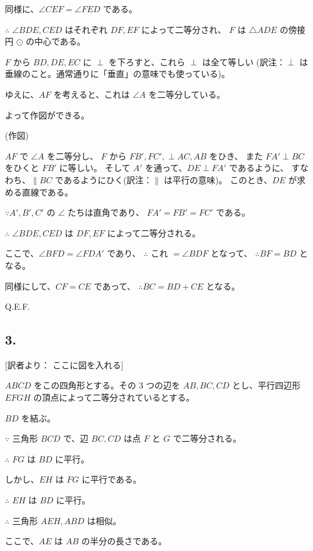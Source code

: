 同様に、$\angle CEF = \angle FED$ である。

$\therefore$ $\angle BDE, CED$ はそれぞれ $DF, EF$ によって二等分され、
$F$ は $\triangle ADE$ の傍接円 $\odot $ の中心である。

$F$ から $BD, DE, EC$ に $\perp$ を下ろすと、これら $\perp$ は全て等しい
(訳注：$\perp$ は垂線のこと。通常通りに「垂直」の意味でも使っている)。

ゆえに、$AF$ を考えると、これは $\angle A$ を二等分している。

よって作図ができる。

\begin{center}(作図)\end{center}

$AF$ で $\angle A$ を二等分し、
$F$ から $FB', FC', \perp AC, AB$ をひき、
また $FA' \perp BC$ をひくと $FB'$ に等しい。
そして $A'$ を通って、$DE \perp FA'$ であるように、
すなわち、$\parallel BC$ であるようにひく(訳注：$\parallel$ は平行の意味)。
このとき、$DE$ が求める直線である。

$\because A', B', C'$ の $\angle$ たちは直角であり、
$FA' = FB' = FC'$ である。

$\therefore$ $\angle BDE, CED$ は $DF, EF$ によって二等分される。

ここで、$\angle BFD = \angle FDA'$ であり、
$\therefore$ これ $= \angle BDF$ となって、
$\therefore BF = BD$ となる。

同様にして、$CF = CE$ であって、
$\therefore BC = BD + CE$ となる。

Q.E.F.

\subsection*{3.}

[訳者より： ここに図を入れる]

$ABCD$ をこの四角形とする。その 3 つの辺を $AB, BC, CD$
とし、平行四辺形 $EFGH$ の頂点によって二等分されているとする。

$BD$ を結ぶ。

$\because$
三角形 $BCD$ で、辺 $BC, CD$ は点 $F$ と $G$ で二等分される。

$\therefore$
$FG$ は $BD$ に平行。

しかし、$EH$ は $FG$ に平行である。

$\therefore$
$EH$ は $BD$ に平行。

$\therefore$
三角形 $AEH, ABD$ は相似。

ここで、$AE$ は $AB$ の半分の長さである。


